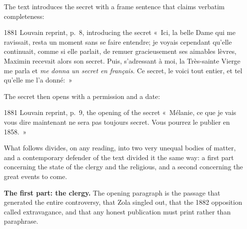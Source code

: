 The text introduces the secret with a frame sentence that claims
verbatim completeness:

\begin{witnesstext}{1881 Louvain reprint, p.~8, introducing the
secret}
«~Ici, la belle Dame qui me ravissait, resta un moment sans se faire
entendre; je voyais cependant qu'elle continuait, comme si elle
parlait, de remuer gracieusement ses aimables lèvres, Maximin
recevait alors son secret. Puis, s'adressant à moi, la Très-sainte
Vierge me parla et \emph{me donna un secret en français}. Ce secret,
le voici tout entier, et tel qu'elle me l'a donné:~»
\end{witnesstext}

The secret then opens with a permission and a date:

\begin{witnesstext}{1881 Louvain reprint, p.~9, the opening of the
secret}
«~Mélanie, ce que je vais vous dire maintenant ne sera pas toujours
secret. Vous pourrez le publier en 1858.~»
\end{witnesstext}

What follows divides, on any reading, into two very unequal bodies
of matter, and a contemporary defender of the text divided it the
same way: a first part concerning the state of the clergy and the
religious, and a second concerning the great events to come.

\textbf{The first part: the clergy.} The opening paragraph is the
passage that generated the entire controversy, that Zola singled
out, that the 1882 opposition called extravagance, and that any
honest publication must print rather than paraphrase.

